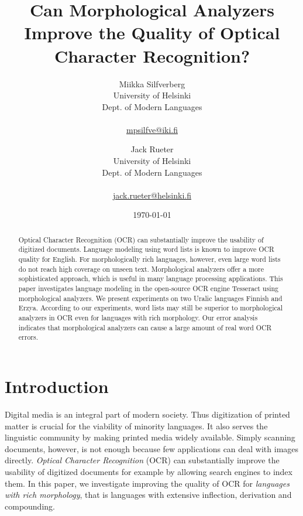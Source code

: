 \documentclass[b5paper]{article}
\begin{document}
\title{Can Morphological Analyzers Improve the Quality of Optical Character Recognition?}

\author{Miikka Silfverberg\\
University of Helsinki\\
Dept. of Modern Languages\\
\\
\url{mpsilfve@iki.fi} \and
Jack Rueter\\
University of Helsinki\\
Dept. of Modern Languages\\
\\
\url{jack.rueter@helsinki.fi} 
}

\date{\today}

\maketitle

\begin{abstract}
\noindent Optical Character Recognition (OCR) can substantially improve
  the usability of digitized documents. Language modeling using word
  lists is known to improve OCR quality for English. For
  morphologically rich languages, however, even large word lists do not reach
  high coverage on unseen text. Morphological analyzers offer a more
  sophisticated approach, which is useful in many language processing
  applications. This paper investigates language modeling in the
  open-source OCR engine Tesseract using morphological analyzers. We
  present experiments on two Uralic languages Finnish and
  Erzya. According to our experiments, word lists may still be
  superior to morphological analyzers in OCR even for languages with
  rich morphology. Our error analysis indicates that morphological
  analyzers can cause a large amount of real word OCR errors.
\end{abstract}

\section{Introduction}

Digital media is an integral part of modern society. Thus digitization
of printed matter is crucial for the viability of minority languages. It
also serves the linguistic community by making printed media widely
available. Simply scanning documents, however, is not enough because
few applications can deal with images directly. {\it Optical Character
  Recognition} (OCR) can substantially improve the usability of
digitized documents for example by allowing search engines to index
them. In this paper, we investigate improving the quality of OCR for
{\it languages with rich morphology}, that is languages with extensive
inflection, derivation and compounding.
\end{document}
